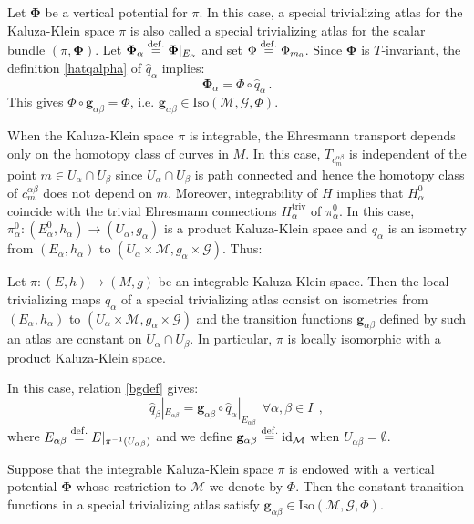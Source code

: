 \documentclass[10pt, cmp, numbook, final, a4paper]{svjour}
\newcommand*{\SavedEqref}{}
\let\SavedEqref\eqref
\renewcommand*{\eqref}[1]{%
  \begingroup
    \hypersetup{
      linkcolor=blue,
      linkbordercolor=blue,
    }%
    \SavedEqref{#1}%
  \endgroup
}
\newcommand{\eqdef}{\stackrel{{\rm def.}}{=}}
\newcommand{\ben}{\begin{equation}}
\newcommand{\een}{\end{equation}}
\newcommand{\id}{\mathrm{id}}
\newcommand{\cM}{\mathcal{M}}
\def\cG{\mathcal{G}}
\def\bg{\mathbf{g}}
\def\bPhi{\mathbf{\Phi}}
\def\bg{\mathbf{g}}
\def\Iso{\mathrm{Iso}}
\def\triv{\mathrm{triv}}
\begin{document}
Let $\bPhi$ be a vertical potential for $\pi$. In this case, a
special trivializing atlas for the Kaluza-Klein space $\pi$ is also
called a special trivializing atlas for the scalar bundle
$(\pi,\bPhi)$. Let $\bPhi_{\alpha} \eqdef \bPhi|_{E_\alpha}$ and set
$\Phi\eqdef \Phi_{m_0}$. Since $\bPhi$ is $T$-invariant, the
definition \eqref{hatqalpha} of ${\hat q}_\alpha$ implies:
\ben
\label{bPhialpha}
\bPhi_\alpha=\Phi\circ {\hat q}_\alpha\, .
\een
This gives $\Phi\circ \bg_{\alpha\beta}=\Phi$,
i.e. $\bg_{\alpha\beta}\in \Iso(\cM,\cG,\Phi)$.
	
	
When the Kaluza-Klein space $\pi$ is integrable, the Ehresmann
transport depends only on the homotopy class of curves in $M$.  In
this case, $T_{c^{\alpha\beta}_m}$ is independent of the point $m\in
U_\alpha\cap U_\beta$ since $U_\alpha\cap U_\beta$ is path connected
and hence the homotopy class of $c^{\alpha\beta}_m$ does not depend on
$m$. Moreover, integrability of $H$ implies that $H_{\alpha}^{0}$
coincide with the trivial Ehresmann connections $H_{\alpha}^{\triv}$
of $\pi^0_{\alpha}$.  In this case, $\pi^0_{\alpha}\colon
(E^0_{\alpha}, h_\alpha)\rightarrow (U_\alpha,g_\alpha)$ is a product
Kaluza-Klein space and $q_\alpha$ is an isometry from $(E_{\alpha},
h_\alpha)$ to $(U_\alpha\times\cM,g_\alpha\times \cG)$. Thus:
	
\begin{proposition}
Let $\pi:(E,h)\rightarrow (M,g)$ be an integrable Kaluza-Klein
space. Then the local trivializing maps $q_\alpha$ of a special
trivializing atlas consist on isometries from $(E_{\alpha}, h_\alpha)$
to $(U_\alpha\times \cM,g_\alpha\times\cG)$ and the transition
functions $\bg_{\alpha\beta}$ defined by such an atlas are constant on
$U_\alpha\cap U_\beta$. In particular, $\pi$ is locally isomorphic
with a product Kaluza-Klein space.
\end{proposition}

\noindent
In this case, relation \eqref{bgdef} gives: 
\ben
\label{bgflat}
{\hat q}_\beta|_{E_{\alpha\beta}}=\bg_{\alpha\beta}\circ {\hat q}_\alpha|_{E_{\alpha\beta}}~~\forall \alpha,\beta\in I~~,
\een
where $E_{\alpha\beta}\eqdef E|_{\pi^{-1}(U_{\alpha\beta})}$ and we
define $\bg_{\alpha\beta}\eqdef \id_\cM$ when
$U_{\alpha\beta}=\emptyset$.
	
\begin{remark}
Suppose that the integrable Kaluza-Klein space $\pi$ is endowed with a
vertical potential $\bPhi$ whose restriction to $\cM$ we denote by
$\Phi$. Then the constant transition functions in a special
trivializing atlas satisfy $\bg_{\alpha\beta}\in \Iso(\cM,\cG,\Phi)$.
\end{remark}
\end{document}
